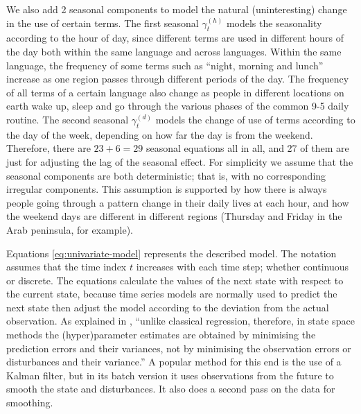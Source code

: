 \documentclass[11pt]{llncs} %
\begin{document}
We also add 2 seasonal components to model the natural (uninteresting) change in the use of certain terms. The first seasonal $\gamma_t^{(h)}$ models the seasonality according to the hour of day, since different terms are used in different hours of the day both within the same language and across languages. Within the same language, the frequency of some terms such as ``night, morning and lunch'' increase as one region passes through different periods of the day. The frequency of all terms of a certain language also change as people in different locations on earth wake up, sleep and go through the various phases of the common 9-5 daily routine. The second seasonal $\gamma_t^{(d)}$ models the change of use of terms according to the day of the week, depending on how far the day is from the weekend. Therefore, there are $23 + 6 = 29$ seasonal equations all in all, and 27 of them are just for adjusting the lag of the seasonal effect. For simplicity we assume that the seasonal components are both deterministic; that is, with no corresponding irregular components. This assumption is supported by how there is always people going through a pattern change in their daily lives at each hour, and how the weekend days are different in different regions (Thursday and Friday in the Arab peninsula, for example).

Equations \eqref{eq:univariate-model} represents the described model. The notation assumes that the time index $t$ increases with each time step; whether continuous or discrete. The equations calculate the values of the next state with respect to the current state, because time series models are normally used to predict the next state then adjust the model according to the deviation from the actual observation. As explained in \cite{Commandeur2007}, ``unlike classical regression, therefore, in state space methods the (hyper)parameter estimates are obtained by minimising the prediction errors and their variances, not by minimising the observation errors or disturbances and their variance.'' A popular method for this end is the use of a Kalman filter, but in its batch version it uses observations from the future to smooth the state and disturbances. It also does a second pass on the data for smoothing.
\end{document}
